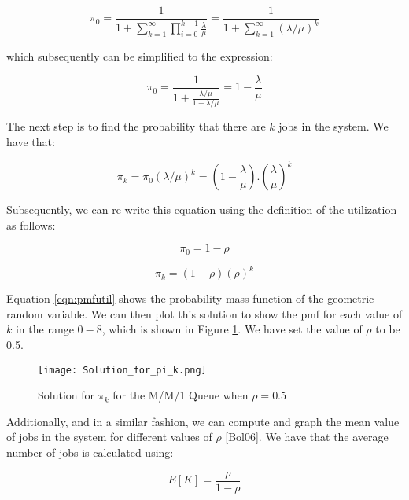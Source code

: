 \documentclass[a4paper,11pt,titlepage]{article}
\begin{document}
\begin{equation}
    \pi_0 = \frac{1}{1 + \sum_{k = 1}^{\infty} \prod_{i = 0}^{k-1} \frac{\lambda}{\mu}} = \frac{1}{1 + \sum_{k = 1}^{\infty} (\lambda / \mu)^k}
\end{equation}

which subsequently can be simplified to the expression: 

\begin{equation}
    \pi_0 = \frac{1}{1 + \frac{\lambda / \mu}{1 - \lambda / \mu}} = 1 - \frac{\lambda}{\mu}
\end{equation}

The next step is to find the probability that there are $k$ jobs in the system. We have that: 

\begin{equation}
    \pi_k = \pi_0 (\lambda / \mu)^k = \left( 1 - \frac{\lambda}{\mu} \right).\left(\frac{\lambda}{\mu} \right)^k
\end{equation}

Subsequently, we can re-write this equation using the definition of the utilization as follows: 

\begin{equation}
    \pi_0 = 1 - \rho
\end{equation}

\begin{equation}
    \label{eqn:pmfutil}
     \pi_k = (1-\rho)(\rho)^k
\end{equation}

Equation \ref{eqn:pmfutil} shows the probability mass function of the geometric random variable. We can then plot this solution to show the pmf for each value of $k$ in the range $0-8$, which is shown in Figure \ref{fig:pmfgraph}. We have set the value of $\rho$ to be 0.5. 

\begin{figure}[h!]
\begin{center}
\texttt{[image: Solution\_for\_pi\_k.png]}
\caption{Solution for $\pi_k$ for the M/M/1 Queue when $\rho = 0.5$}
\label{fig:pmfgraph}
\end{center}
\end{figure}

Additionally, and in a similar fashion, we can compute and graph the mean value of jobs in the system for different values of $\rho$ [Bol06]. We have that the average number of jobs is calculated using: 

\begin{equation}
    E[K] = \frac{\rho}{1-\rho}
\end{equation}
\end{document}
